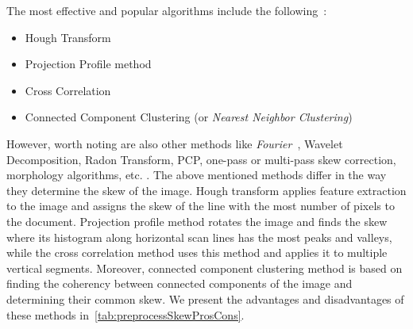 The most effective and popular algorithms include the following~\citep{skewBestTechniques}:
\begin{itemize}
    \item Hough Transform
    \item Projection Profile method
    \item Cross Correlation
    \item Connected Component Clustering (or \emph{Nearest Neighbor Clustering})~\citep{skewClustering}
\end{itemize}
However, worth noting are also other methods like \emph{Fourier}~\citep{fourierTransform}, Wavelet Decomposition, Radon Transform, PCP, one-pass or multi-pass skew correction, morphology algorithms, etc.
.
The above mentioned methods differ in the way they determine the skew of the image. Hough transform applies feature extraction to the image and assigns the skew of the line with the most number of pixels to the document. Projection profile method rotates the image and finds the skew where its histogram along horizontal scan lines has the most peaks and valleys, while the cross correlation method uses this method and applies it to multiple vertical segments. Moreover, connected component clustering method is based on finding the coherency between connected components of the image and determining their common skew. We present the advantages and disadvantages of these methods in~\cref{tab:preprocessSkewProsCons}.

